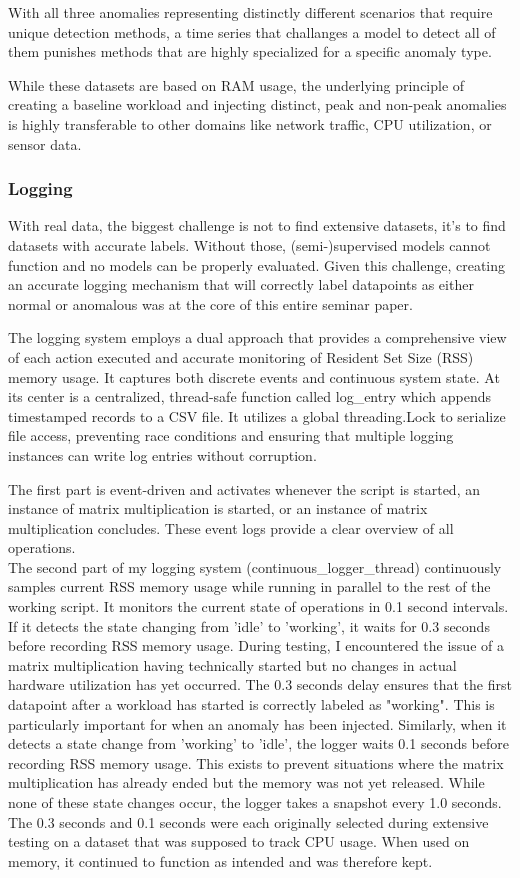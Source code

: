 \documentclass[12pt,oneside]{article}
\begin{document}
With all three anomalies representing distinctly different scenarios that require unique detection methods, a time series that challanges a model to detect all of them punishes methods that are highly specialized for a specific anomaly type. \par
While these datasets are based on RAM usage, the underlying principle of creating a baseline workload and injecting distinct, peak and non-peak anomalies is highly transferable to other domains like network traffic, CPU utilization, or sensor data.

\subsubsection{Logging}

With real data, the biggest challenge is not to find extensive datasets, it's to find datasets with accurate labels. Without those, (semi-)supervised models cannot function and no models can be properly evaluated. Given this challenge, creating an accurate logging mechanism that will correctly label datapoints as either normal or anomalous was at the core of this entire seminar paper. \par
The logging system employs a dual approach that provides a comprehensive view of each action executed and accurate monitoring of Resident Set Size (RSS) memory usage. It captures both discrete events and continuous system state. At its center is a centralized, thread-safe function called log\_entry which appends timestamped records to a CSV file. It utilizes a global threading.Lock to serialize file access, preventing race conditions and ensuring that multiple logging instances can write log entries without corruption. \par
The first part is event-driven and activates whenever the script is started, an instance of matrix multiplication is started, or an instance of matrix multiplication concludes. These event logs provide a clear overview of all operations. \\
The second part of my logging system (continuous\_logger\_thread) continuously samples current RSS memory usage while running in parallel to the rest of the working script. It monitors the current state of operations in 0.1 second intervals. If it detects the state changing from 'idle' to 'working', it waits for 0.3 seconds before recording RSS memory usage. During testing, I encountered the issue of a matrix multiplication having technically started but no changes in actual hardware utilization has yet occurred. The 0.3 seconds delay ensures that the first datapoint after a workload has started is correctly labeled as "working". This is particularly important for when an anomaly has been injected. Similarly, when it detects a state change from 'working' to 'idle', the logger waits 0.1 seconds before recording RSS memory usage. This exists to prevent situations where the matrix multiplication has already ended but the memory was not yet released. While none of these state changes occur, the logger takes a snapshot every 1.0 seconds. The 0.3 seconds and 0.1 seconds were each originally selected during extensive testing on a dataset that was supposed to track CPU usage. When used on memory, it continued to function as intended and was therefore kept.
\end{document}
